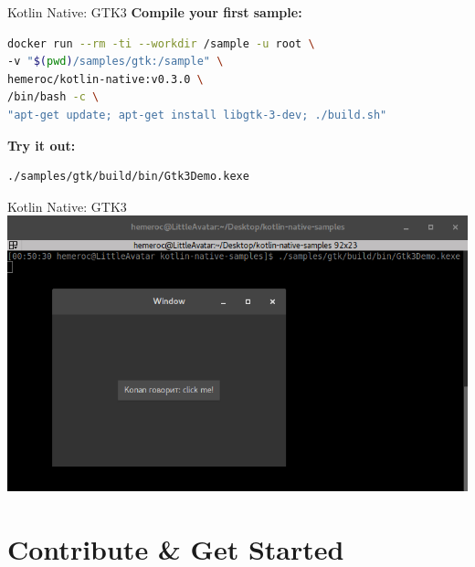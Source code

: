 \begin{frame}[fragile]{Kotlin Native: GTK3}
	\textbf{Compile your first sample:}\\\vspace{.5\baselineskip}
\begin{lstlisting}[language=bash,basicstyle=\ttfamily\small]
docker run --rm -ti --workdir /sample -u root \
-v "$(pwd)/samples/gtk:/sample" \
hemeroc/kotlin-native:v0.3.0 \
/bin/bash -c \
"apt-get update; apt-get install libgtk-3-dev; ./build.sh"
\end{lstlisting}
	\textbf{Try it out:}\\\vspace{.5\baselineskip}
\begin{lstlisting}[language=bash,basicstyle=\ttfamily\small]
./samples/gtk/build/bin/Gtk3Demo.kexe
\end{lstlisting}
\end{frame}

\begin{frame}[fragile]{Kotlin Native: GTK3}
	\includegraphics[width=0.85\paperwidth]{figures/gtk3}
\end{frame}

\section{Contribute \& Get Started}

